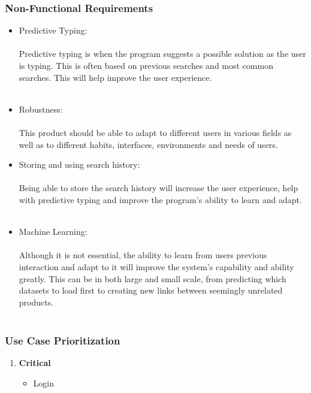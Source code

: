 \documentclass[a4paper,10pt]{article}
\begin{document}
{	\subsubsection{Non-Functional Requirements}
		\begin{itemize}
		\item Predictive Typing:\\\\
			Predictive typing is when the program suggests a possible solution as the user is typing. This is often based on previous searches and most common searches. This will help improve the user experience. \\\\
	
		\item Robustness:\\\\
			This product should be able to adapt to different users in various fields as well as to different habits, interfaces, environments and needs of users.  
	
		\item Storing and using search history:\\\\
			Being able to store the search history will increase the user experience, help with predictive typing and improve the program's ability to learn and adapt.\\\\
	
		\item Machine Learning:\\\\
			Although it is not essential, the ability to learn from users previous interaction and adapt to it will improve the system’s capability and ability greatly. This can be in both large and small scale, from predicting which datasets to load first to creating new links between seemingly unrelated products.\\\\
		\end{itemize}

	
	\subsubsection{Use Case Prioritization} 
		\begin{enumerate} 
		\item \textbf{Critical} 
			\begin{itemize} 
				\item Login

\end{itemize}
\end{enumerate}}
\end{document}
